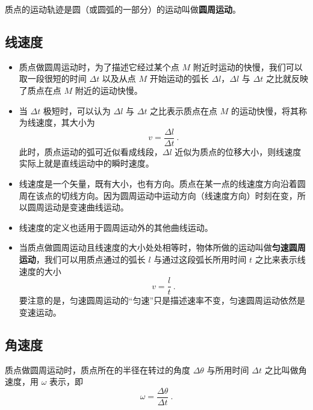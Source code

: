 

质点的运动轨迹是圆（或圆弧的一部分）的运动叫做\textbf{圆周运动}。

\subsection{线速度}

\begin{itemize}
\item 质点做圆周运动时，为了描述它经过某个点 $M$ 附近时运动的快慢，我们可以取一段很短的时间 $\Delta t$ 以及从点 $M$ 开始运动的弧长 $\Delta l$，$\Delta l$ 与 $\Delta t$ 之比就反映了质点在点 $M$ 附近的运动快慢。

\item 当 $\Delta t$ 极短时，可以认为 $\Delta l$ 与 $\Delta t$ 之比表示质点在点 $M$ 的运动快慢，将其称为线速度，其大小为
\begin{equation}
v=\frac{\Delta l}{\Delta t}~.
\end{equation}
此时，质点运动的弧可近似看成线段，$\Delta l$ 近似为质点的位移大小，则线速度实际上就是直线运动中的瞬时速度。

\item 线速度是一个矢量，既有大小，也有方向。质点在某一点的线速度方向沿着圆周在该点的切线方向。因为圆周运动中运动方向（线速度方向）时刻在变，所以圆周运动是变速曲线运动。

\item 线速度的定义也适用于圆周运动外的其他曲线运动。

\item 当质点做圆周运动且线速度的大小处处相等时，物体所做的运动叫做\textbf{匀速圆周运动}，我们可以用质点通过的弧长 $l$ 与通过这段弧长所用时间 $t$ 之比来表示线速度的大小
\begin{equation}
v=\frac{l}{t}~.
\end{equation}
要注意的是，匀速圆周运动的“匀速”只是描述速率不变，匀速圆周运动依然是变速运动。
\end{itemize}

\subsection{角速度}

质点做圆周运动时，质点所在的半径在转过的角度 $\Delta \theta$ 与所用时间 $\Delta t$ 之比叫做角速度，用 $\omega$ 表示，即
\begin{equation}
\omega = \frac{\Delta \theta}{\Delta t}~.
\end{equation}

